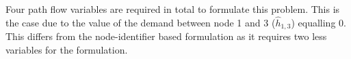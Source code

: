 Four path flow variables are required in total to formulate this problem. This
is the case due to the value of the demand between node 1 and 3
($\hat{h}_{1,3}$) equalling 0. This differs from the node-identifier based
formulation as it requires two less variables for the formulation.
